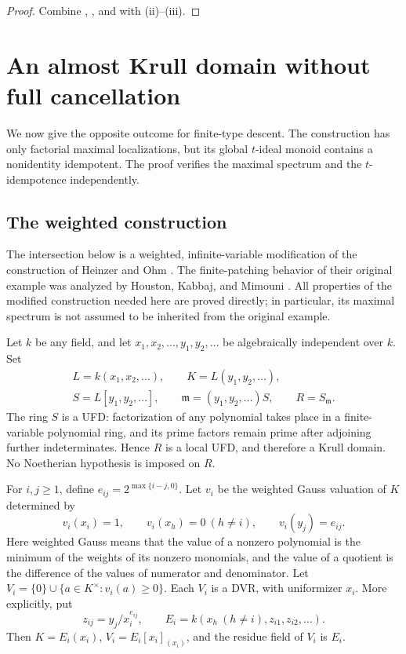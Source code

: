 \documentclass[11pt]{amsart}
\theoremstyle{definition}
\theoremstyle{remark}
\newcommand{\m}{\mathfrak m}
\begin{document}
\begin{proof}
Combine , , and  with
(ii)--(iii).
\end{proof}

\section{An almost Krull domain without full cancellation}\label{sec:counterexample}

We now give the opposite outcome for finite-type descent.  The construction
has only factorial maximal localizations, but its global $t$-ideal monoid
contains a nonidentity idempotent.  The proof verifies the maximal spectrum
and the $t$-idempotence independently.

\subsection{The weighted construction}

The intersection below is a weighted, infinite-variable modification of
the construction of Heinzer and Ohm \cite{HeinzerOhm}.  The finite-patching
behavior of their original example was analyzed by Houston, Kabbaj, and
Mimouni \cite[Example~3.3]{HoustonKabbajMimouni}.  All properties of the
modified construction needed here are proved directly; in particular, its
maximal spectrum is not assumed to be inherited from the original example.

Let $k$ be any field, and let $x_1,x_2,\ldots,y_1,y_2,\ldots$ be
algebraically independent over $k$.  Set
\[
 \begin{gathered}
 L=k(x_1,x_2,\ldots),\qquad K=L(y_1,y_2,\ldots),\\
 S=L[y_1,y_2,\ldots],\qquad
 \m=(y_1,y_2,\ldots)S,\qquad R=S_{\m}.
 \end{gathered}
\]
The ring $S$ is a UFD: factorization of any polynomial takes place in a
finite-variable polynomial ring, and its prime factors remain prime after
adjoining further indeterminates.  Hence $R$ is a local UFD, and therefore
a Krull domain.  No Noetherian hypothesis is imposed on $R$.

For $i,j\ge1$, define $e_{ij}=2^{\max\{i-j,0\}}$.  Let $v_i$ be the
weighted Gauss valuation of $K$ determined by
\begin{equation}\label{akneg:weights}
 v_i(x_i)=1,\qquad v_i(x_h)=0\ (h\ne i),\qquad v_i(y_j)=e_{ij}.
\end{equation}
Here weighted Gauss means that the value of a nonzero polynomial is the
minimum of the weights of its nonzero monomials, and the value of a
quotient is the difference of the values of numerator and denominator.
Let $V_i=\{0\}\cup\{a\in K^{\times}:v_i(a)\ge0\}$.
Each $V_i$ is a DVR, with uniformizer $x_i$.  More explicitly, put
\[
 z_{ij}=y_j/x_i^{e_{ij}},\qquad
 E_i=k(x_h\ (h\ne i),z_{i1},z_{i2},\ldots).
\]
Then $K=E_i(x_i)$, $V_i=E_i[x_i]_{(x_i)}$, and the residue field of $V_i$
is $E_i$.
\end{document}
